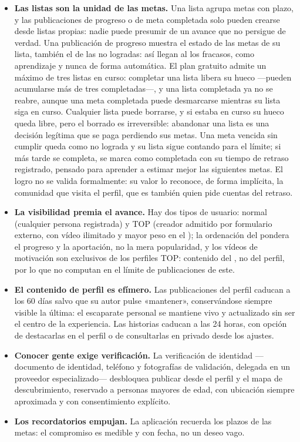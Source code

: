 \begin{itemize}
  \item \textbf{Las listas son la unidad de las metas.}
        Una lista agrupa metas con plazo, y las publicaciones de progreso o de meta completada solo pueden crearse desde listas propias: nadie puede presumir de un avance que no persigue de verdad.
        Una publicación de progreso muestra el estado de las metas de su lista, también el de las no logradas: así llegan al  los fracasos, como aprendizaje y nunca de forma automática.
        El plan gratuito admite un máximo de tres listas en curso: completar una lista libera su hueco —pueden acumularse más de tres completadas—, y una lista completada ya no se reabre, aunque una meta completada puede desmarcarse mientras su lista siga en curso.
        Cualquier lista puede borrarse, y si estaba en curso su hueco queda libre, pero el borrado es irreversible: abandonar una lista es una decisión legítima que se paga perdiendo sus metas.
        Una meta vencida sin cumplir queda como no lograda y su lista sigue contando para el límite; si más tarde se completa, se marca como completada con su tiempo de retraso registrado, pensado para aprender a estimar mejor las siguientes metas.
        El logro no se valida formalmente: su valor lo reconoce, de forma implícita, la comunidad que visita el perfil, que es también quien pide cuentas del retraso.
  \item \textbf{La visibilidad premia el avance.}
        Hay dos tipos de usuario: normal (cualquier persona registrada) y TOP (creador admitido por formulario externo, con vídeo ilimitado y mayor peso en el ); la ordenación del  pondera el progreso y la aportación, no la mera popularidad, y los vídeos de motivación son exclusivos de los perfiles TOP: contenido del , no del perfil, por lo que no computan en el límite de publicaciones de este.
  \item \textbf{El contenido de perfil es efímero.}
        Las publicaciones del perfil caducan a los 60 días salvo que su autor pulse «mantener», conservándose siempre visible la última: el escaparate personal se mantiene vivo y actualizado sin ser el centro de la experiencia.
        Las historias caducan a las 24 horas, con opción de destacarlas en el perfil o de consultarlas en privado desde los ajustes.
  \item \textbf{Conocer gente exige verificación.}
        La verificación de identidad —documento de identidad, teléfono y fotografías de validación, delegada en un proveedor especializado— desbloquea publicar desde el perfil y el mapa de descubrimiento, reservado a personas mayores de edad, con ubicación siempre aproximada y con consentimiento explícito.
  \item \textbf{Los recordatorios empujan.}
        La aplicación recuerda los plazos de las metas: el compromiso es medible y con fecha, no un deseo vago.
\end{itemize}

